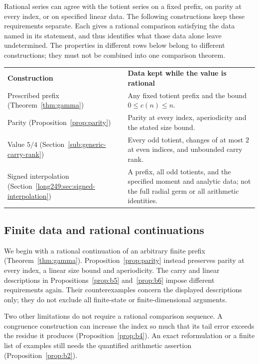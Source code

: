 \documentclass[11pt]{article}
\theoremstyle{plain}
\theoremstyle{definition}
\theoremstyle{remark}
\begin{document}
Rational series can agree with the totient series on a fixed prefix,
on parity at every index, or on specified linear data. The following
constructions keep these requirements separate. Each gives a rational
comparison satisfying the data named in its statement, and thus
identifies what those data alone leave undetermined.
The properties in different rows below belong to different constructions;
they must not be combined into one comparison theorem.
\begin{center}
\begin{tabular}{@{}p{.29\linewidth}p{.65\linewidth}@{}}
\textbf{Construction} & \textbf{Data kept while the value is rational}\\[3pt]
Prescribed prefix (Theorem~\ref{thm:gamma}) &
Any fixed totient prefix and the bound $0\le c(n)\le n$.\\[3pt]
Parity (Proposition~\ref{prop:parity}) &
Parity at every index, aperiodicity and the stated size bound.\\[3pt]
Value $5/4$ (Section~\ref{sub:generic-carry-rank}) &
Every odd totient, changes of at most $2$ at even indices, and unbounded carry rank.\\[3pt]
Signed interpolation (Section~\ref{long249:sec:signed-interpolation}) &
A prefix, all odd totients, and the specified moment and analytic data;
not the full radial germ or all arithmetic identities.
\end{tabular}
\end{center}

\subsection{Finite data and rational continuations}

We begin with a rational continuation of an arbitrary finite prefix
(Theorem~\ref{thm:gamma}). Proposition~\ref{prop:parity} instead
preserves parity at every index, a linear size bound and aperiodicity.
The carry and linear descriptions in Propositions~\ref{prop:b5}
and~\ref{prop:b6} impose different requirements again. Their
counterexamples concern the displayed descriptions only; they do not
exclude all finite-state or finite-dimensional arguments.

Two other limitations do not require a rational comparison sequence.
A congruence construction can increase the index so much that its tail
error exceeds the residue it produces (Proposition~\ref{prop:b4}). An exact
reformulation or a finite list of examples still needs the quantified
arithmetic assertion (Proposition~\ref{prop:b2}).
\end{document}
